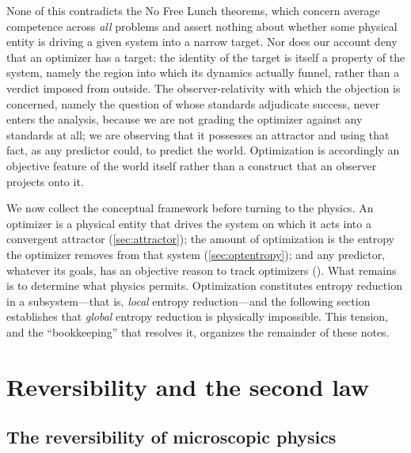 \documentclass[11pt]{article}
\begin{document}
None of this contradicts the No Free Lunch theorems, which concern average competence across \emph{all} problems and assert nothing about whether some physical entity is driving a given system into a narrow target. Nor does our account deny that an optimizer has a target: the identity of the target is itself a property of the system, namely the region into which its dynamics actually funnel, rather than a verdict imposed from outside. The observer-relativity with which the objection is concerned, namely the question of whose standards adjudicate success, never enters the analysis, because we are not grading the optimizer against any standards at all; we are observing that it possesses an attractor and using that fact, as any predictor could, to predict the world. Optimization is accordingly an objective feature of the world itself rather than a construct that an observer projects onto it.

We now collect the conceptual framework before turning to the physics. An optimizer is a physical entity that drives the system on which it acts into a convergent attractor (\cref{sec:attractor}); the amount of optimization is the entropy the optimizer removes from that system (\cref{sec:optentropy}); and any predictor, whatever its goals, has an objective reason to track optimizers (). What remains is to determine what physics permits. Optimization constitutes entropy reduction in a subsystem---that is, \emph{local} entropy reduction---and the following section establishes that \emph{global} entropy reduction is physically impossible. This tension, and the ``bookkeeping'' that resolves it, organizes the remainder of these notes.
\section{Reversibility and the second law}
\label{sec:secondlaw}

\subsection{The reversibility of microscopic physics}
\label{sec:reversible}
\end{document}
